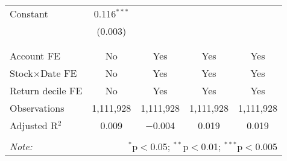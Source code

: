 \begin{table}[!htbp]
\begin{tabular}{@{\extracolsep{5pt}}lcccc}
 Constant & 0.116$^{***}$ &  &  &  \\ 
  & (0.003) &  &  &  \\ 
  & & & & \\ 
\hline \\[-1.8ex] 
Account FE & No & Yes & Yes & Yes \\ 
Stock$\times$Date FE & No & Yes & Yes & Yes \\ 
Return decile FE & No & Yes & Yes & Yes \\ 
Observations & 1,111,928 & 1,111,928 & 1,111,928 & 1,111,928 \\ 
Adjusted R$^{2}$ & 0.009 & $-$0.004 & 0.019 & 0.019 \\ 
\hline 
\hline \\[-1.8ex] 
\textit{Note:}  & \multicolumn{4}{r}{$^{*}$p$<$0.05; $^{**}$p$<$0.01; $^{***}$p$<$0.005} \\ 
\end{tabular} 
\end{table} 
